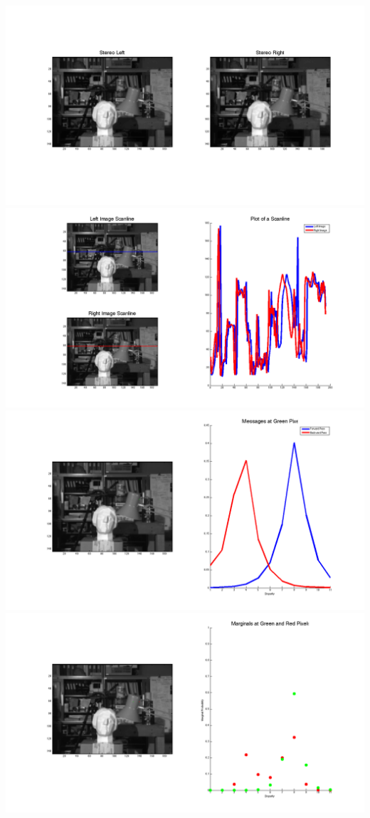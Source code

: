\documentclass[12pt,twoside]{article}
\begin{document}
    \includegraphics[scale=.15]{5_1a}
    \includegraphics[scale=.15]{5_1b} \newline
    \includegraphics[scale=.15]{5_1c}
    \includegraphics[scale=.15]{5_1d} \newline
\end{document}
